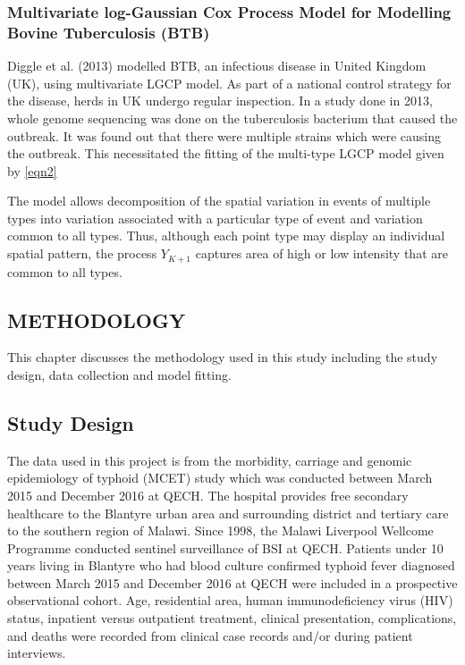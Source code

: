 \documentclass[12pt,a4paper]{report}
\begin{document}
\subsection{Multivariate log-Gaussian Cox Process Model for Modelling Bovine Tuberculosis (BTB)}

Diggle et al. (2013) modelled BTB, an infectious disease in United Kingdom (UK), using multivariate LGCP model. As part of a national control strategy for the disease, herds in UK undergo regular inspection. In a study done in 2013, whole genome sequencing was done on the tuberculosis bacterium that caused the outbreak. It was found out that there were multiple strains which were causing the outbreak. This necessitated the fitting of the multi-type LGCP model given by \ref{eqn2}

The model allows decomposition of the spatial variation in events of multiple types into variation associated with a particular type of event and variation common to all types. Thus, although each point type may display an individual spatial pattern, the process $Y_{K+1}$ captures area of high or low intensity that are common to all types.

\begin{center}
\chapter{METHODOLOGY}
\end{center} 

This chapter discusses the methodology used in this study including the study design, data collection and model fitting.

\section{Study Design}

The data used in this project is from the morbidity, carriage and genomic epidemiology of typhoid (MCET) study which was conducted between March 2015 and December 2016 at QECH. The hospital provides free secondary healthcare to the Blantyre urban area and surrounding
district and tertiary care to the southern region of Malawi. Since 1998, the Malawi Liverpool Wellcome Programme conducted sentinel surveillance of BSI at
QECH\cite{Musicha}. Patients under 10 years living in Blantyre who had
blood culture confirmed typhoid fever diagnosed between March 2015 and December 2016 at QECH were included in a prospective observational cohort.\cite{Feasey} Age, residential area, human immunodeficiency virus (HIV) status, inpatient versus outpatient
treatment, clinical presentation, complications, and deaths
were recorded from clinical case records and/or during patient interviews.\cite{Feasey}
\end{document}
